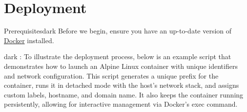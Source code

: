 \section{Deployment}
\label{Prerequisites}
\begin{baseBoxThree}{Prerequisites}{dark}
    Before we begin, ensure you have an up-to-date version of \href{https://docs.docker.com/get-docker/}{Docker} installed.
\end{baseBoxThree}

\label{Deployment Script}
\begin{baseBoxThree}{}{dark}
    \bigskip
    : To illustrate the deployment process, below is an example script that demonstrates how to launch an Alpine Linux container with unique identifiers and network configuration.
    This script generates a unique prefix for the container, runs it in detached mode with the host's network stack, and assigns custom labels, hostname, and domain name. It also keeps the container running persistently, allowing for interactive management via Docker's exec command.
    \bigskip


\end{baseBoxThree}
